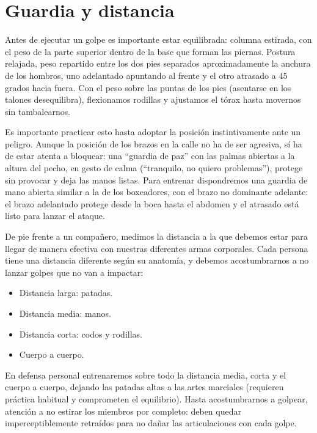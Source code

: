 \chapter{Guardia y distancia}

Antes de ejecutar un golpe es importante estar equilibrada: columna estirada, con el peso de la parte superior dentro de la base que forman las piernas. Postura relajada, peso repartido entre los dos pies separados aproximadamente la anchura de los hombros, uno adelantado apuntando al frente y el otro atrasado a 45 grados hacia fuera. Con el peso sobre las puntas de los pies (asentarse en los talones desequilibra), flexionamos rodillas y ajustamos el tórax hasta movernos sin tambalearnos.

Es importante practicar esto hasta adoptar la posición instintivamente ante un peligro. Aunque la posición de los brazos en la calle no ha de ser agresiva, sí ha de estar atenta a bloquear: una \enquote{guardia de paz} con las palmas abiertas a la altura del pecho, en gesto de calma (\enquote{tranquilo, no quiero problemas}), protege sin provocar y deja las manos listas. Para entrenar dispondremos una guardia de mano abierta similar a la de los boxeadores, con el brazo no dominante adelante: el brazo adelantado protege desde la boca hasta el abdomen y el atrasado está listo para lanzar el ataque.

De pie frente a un compañero, medimos la distancia a la que debemos estar para llegar de manera efectiva con nuestras diferentes armas corporales. Cada persona tiene una distancia diferente según su anatomía, y debemos acostumbrarnos a no lanzar golpes que no van a impactar:

\begin{itemize}
  \item Distancia larga: patadas.
  \item Distancia media: manos.
  \item Distancia corta: codos y rodillas.
  \item Cuerpo a cuerpo.
\end{itemize}

En defensa personal entrenaremos sobre todo la distancia media, corta y el cuerpo a cuerpo, dejando las patadas altas a las artes marciales (requieren práctica habitual y comprometen el equilibrio). Hasta acostumbrarnos a golpear, atención a no estirar los miembros por completo: deben quedar imperceptiblemente retraídos para no dañar las articulaciones con cada golpe.

